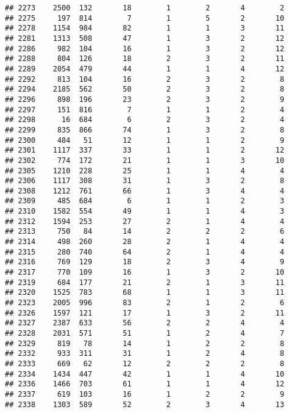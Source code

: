 \documentclass[]{article}
\begin{document}
\begin{verbatim}
## 2273    2500  132       18        1        2       4        2
## 2275     197  814        7        1        5       2       10
## 2278    1154  984       82        1        1       3       11
## 2281    1313  508       47        1        3       2       12
## 2286     982  104       16        1        3       2       12
## 2288     804  126       18        2        3       2       11
## 2289    2054  479       44        1        1       4       12
## 2292     813  104       16        2        3       2        8
## 2294    2185  562       50        2        3       2        8
## 2296     898  196       23        2        3       2        9
## 2297     151  816        7        1        1       2        4
## 2298      16  684        6        2        3       2        4
## 2299     835  866       74        1        3       2        8
## 2300     484   51       12        1        1       2        9
## 2301    1117  337       33        1        1       2       12
## 2302     774  172       21        1        1       3       10
## 2305    1210  228       25        1        1       4        4
## 2306    1117  308       31        1        3       2        8
## 2308    1212  761       66        1        3       4        4
## 2309     485  684        6        1        1       2        3
## 2310    1582  554       49        1        1       4        3
## 2312    1594  253       27        2        1       4        4
## 2313     750   84       14        2        2       2        6
## 2314     498  260       28        2        1       4        4
## 2315     280  740       64        2        1       4        4
## 2316     769  129       18        2        3       4        9
## 2317     770  109       16        1        3       2       10
## 2319     684  177       21        2        1       3       11
## 2320    1525  783       68        1        1       3       11
## 2323    2005  996       83        2        1       2        6
## 2326    1597  121       17        1        3       2       11
## 2327    2387  633       56        2        2       4        4
## 2328    2031  571       51        1        2       4        7
## 2329     819   78       14        1        2       2        8
## 2332     933  311       31        1        2       4        8
## 2333     669   62       12        2        2       2        8
## 2334    1434  447       42        1        1       4       10
## 2336    1466  703       61        1        1       4       12
## 2337     619  103       16        1        2       2        9
## 2338    1303  589       52        2        3       4       13

\end{verbatim}
\end{document}

